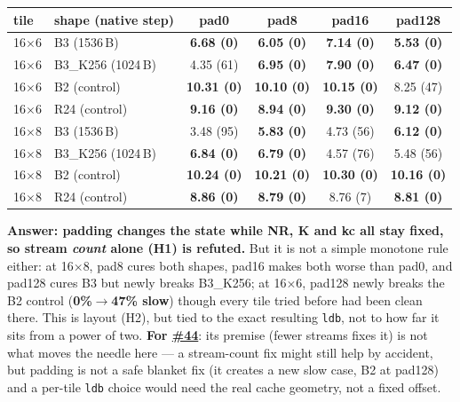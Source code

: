 \documentclass[10pt,a4paper]{article}
\newcommand{\iss}[1]{\href{https://github.com/JieGH/RVV_code_gen_via_MLIR_xDSL/issues/#1}{\##1}}
\newcommand{\up}[1]{\textcolor{red!70!black}{#1}}
\newcommand{\good}[1]{\textcolor{green!45!black}{\textbf{#1}}}
\begin{document}
\begin{center}\footnotesize\setlength{\tabcolsep}{4pt}
\begin{tabular}{@{}llcccc@{}}
\toprule
tile & shape (native step) & pad0 & pad8 & pad16 & pad128 \\
\midrule
16$\times$6 & B3 (1536\,B) & \good{6.68 (0)} & \good{6.05 (0)} & \good{7.14 (0)} & \good{5.53 (0)} \\
16$\times$6 & B3\_K256 (1024\,B) & \up{4.35 (61)} & \good{6.95 (0)} & \good{7.90 (0)} & \good{6.47 (0)} \\
16$\times$6 & B2 (control) & \good{10.31 (0)} & \good{10.10 (0)} & \good{10.15 (0)} & \up{8.25 (47)} \\
16$\times$6 & R24 (control) & \good{9.16 (0)} & \good{8.94 (0)} & \good{9.30 (0)} & \good{9.12 (0)} \\
16$\times$8 & B3 (1536\,B) & \up{3.48 (95)} & \good{5.83 (0)} & \up{4.73 (56)} & \good{6.12 (0)} \\
16$\times$8 & B3\_K256 (1024\,B) & \good{6.84 (0)} & \good{6.79 (0)} & \up{4.57 (76)} & \up{5.48 (56)} \\
16$\times$8 & B2 (control) & \good{10.24 (0)} & \good{10.21 (0)} & \good{10.30 (0)} & \good{10.16 (0)} \\
16$\times$8 & R24 (control) & \good{8.86 (0)} & \good{8.79 (0)} & 8.76 (7) & \good{8.81 (0)} \\
\bottomrule
\end{tabular}
\end{center}
\textbf{Answer: padding changes the state while NR, K and kc all stay fixed, so stream \emph{count} alone (H1) is
refuted.} But it is not a simple monotone rule either: at 16$\times$8, pad8 cures both shapes, pad16 makes both worse
than pad0, and pad128 cures B3 but newly breaks B3\_K256; at 16$\times$6, pad128 newly breaks the B2 control
(\textbf{0\%$\to$47\% slow}) though every tile tried before had been clean there. This is layout (H2), but tied to the
exact resulting \texttt{ldb}, not to how far it sits from a power of two. \textbf{For \iss{44}}: its premise (fewer
streams fixes it) is not what moves the needle here --- a stream-count fix might still help by accident, but padding
is not a safe blanket fix (it creates a new slow case, B2 at pad128) and a per-tile \texttt{ldb} choice would need the
real cache geometry, not a fixed offset.
\end{document}
